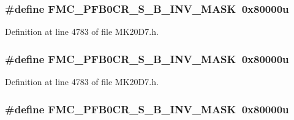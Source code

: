 \subsubsection[{\texorpdfstring{F\+M\+C\+\_\+\+P\+F\+B0\+C\+R\+\_\+\+S\+\_\+\+B\+\_\+\+I\+N\+V\+\_\+\+M\+A\+SK}{FMC_PFB0CR_S_B_INV_MASK}}]{\setlength{\rightskip}{0pt plus 5cm}\#define F\+M\+C\+\_\+\+P\+F\+B0\+C\+R\+\_\+\+S\+\_\+\+B\+\_\+\+I\+N\+V\+\_\+\+M\+A\+SK~0x80000u}\hypertarget{group___f_m_c___register___masks_ga74a064f6c3eaf054162fde2404485904}{}\label{group___f_m_c___register___masks_ga74a064f6c3eaf054162fde2404485904}


Definition at line 4783 of file M\+K20\+D7.\+h.

\subsubsection[{\texorpdfstring{F\+M\+C\+\_\+\+P\+F\+B0\+C\+R\+\_\+\+S\+\_\+\+B\+\_\+\+I\+N\+V\+\_\+\+M\+A\+SK}{FMC_PFB0CR_S_B_INV_MASK}}]{\setlength{\rightskip}{0pt plus 5cm}\#define F\+M\+C\+\_\+\+P\+F\+B0\+C\+R\+\_\+\+S\+\_\+\+B\+\_\+\+I\+N\+V\+\_\+\+M\+A\+SK~0x80000u}\hypertarget{group___f_m_c___register___masks_ga74a064f6c3eaf054162fde2404485904}{}\label{group___f_m_c___register___masks_ga74a064f6c3eaf054162fde2404485904}


Definition at line 4783 of file M\+K20\+D7.\+h.

\subsubsection[{\texorpdfstring{F\+M\+C\+\_\+\+P\+F\+B0\+C\+R\+\_\+\+S\+\_\+\+B\+\_\+\+I\+N\+V\+\_\+\+M\+A\+SK}{FMC_PFB0CR_S_B_INV_MASK}}]{\setlength{\rightskip}{0pt plus 5cm}\#define F\+M\+C\+\_\+\+P\+F\+B0\+C\+R\+\_\+\+S\+\_\+\+B\+\_\+\+I\+N\+V\+\_\+\+M\+A\+SK~0x80000u}\hypertarget{group___f_m_c___register___masks_ga74a064f6c3eaf054162fde2404485904}{}\label{group___f_m_c___register___masks_ga74a064f6c3eaf054162fde2404485904}


